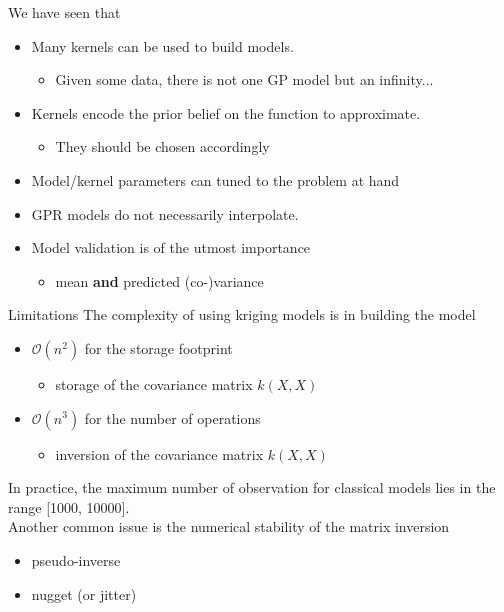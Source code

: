 \documentclass{beamer}
\begin{document}
\begin{frame}{}
 We have seen that \vspace{2mm}
\begin{block}{}
\begin{itemize}
 \item Many kernels can be used to build models.
 \begin{itemize}
  \item Given some data, there is not one GP model but an infinity...
 \end{itemize} \vspace{2mm}
 \item Kernels encode the prior belief on the function to approximate.
 \begin{itemize}
  \item They should be chosen accordingly
 \end{itemize}\vspace{2mm}
 \item Model/kernel parameters can tuned to the problem at hand \vspace{2mm}
 \item GPR models do not necessarily interpolate. \vspace{2mm}
 \item Model validation is of the utmost importance
 \begin{itemize}
    \item mean \textbf{and} predicted (co-)variance
  \end{itemize}
\end{itemize}
\end{block}
\end{frame}

\begin{frame}{Limitations}
The complexity of using kriging models is in building the model
\begin{itemize}
  \item $\mathcal{O}(n^2)$ for the storage footprint
  \begin{itemize}
    \item storage of the covariance matrix $k(X,X)$
  \end{itemize}
  \item $\mathcal{O}(n^3)$ for the number of operations
    \begin{itemize}
    \item inversion of the covariance matrix $k(X,X)$
  \end{itemize}
\end{itemize}
In practice, the maximum number of observation for classical models lies in the range [1000, 10000].\\
\vspace{5mm}
Another common issue is the numerical stability of the matrix inversion
\begin{itemize}
  \item pseudo-inverse
  \item nugget (or jitter)
\end{itemize}
\end{frame}
\end{document}
